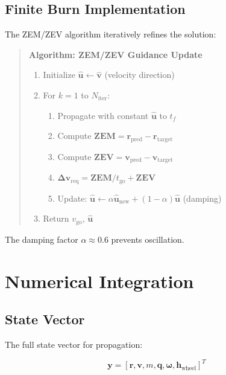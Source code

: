 \documentclass[11pt,a4paper]{article}
\newcommand{\vect}[1]{\bm{#1}}
\newcommand{\quat}[1]{\mathbf{#1}}
\begin{document}
\subsection{Finite Burn Implementation}

The ZEM/ZEV algorithm iteratively refines the solution:

\begin{quote}
\textbf{Algorithm: ZEM/ZEV Guidance Update}
\begin{enumerate}
    \item Initialize $\hat{\vect{u}} \gets \hat{\vect{v}}$ (velocity direction)
    \item For $k = 1$ to $N_\text{iter}$:
    \begin{enumerate}
        \item Propagate with constant $\hat{\vect{u}}$ to $t_f$
        \item Compute $\vect{\text{ZEM}} = \vect{r}_\text{pred} - \vect{r}_\text{target}$
        \item Compute $\vect{\text{ZEV}} = \vect{v}_\text{pred} - \vect{v}_\text{target}$
        \item $\vect{\Delta v}_\text{req} = \vect{\text{ZEM}}/t_\text{go} + \vect{\text{ZEV}}$
        \item Update: $\hat{\vect{u}} \gets \alpha \hat{\vect{u}}_\text{new} + (1-\alpha) \hat{\vect{u}}$ (damping)
    \end{enumerate}
    \item Return $v_\text{go}$, $\hat{\vect{u}}$
\end{enumerate}
\end{quote}

The damping factor $\alpha \approx 0.6$ prevents oscillation.

\section{Numerical Integration}

\subsection{State Vector}

The full state vector for propagation:

\begin{equation}
    \vect{y} = [\vect{r}, \vect{v}, m, \quat{q}, \vect{\omega}, \vect{h}_\text{wheel}]^T
\end{equation}
\end{document}
